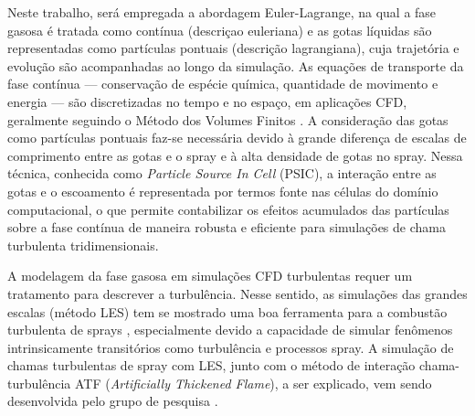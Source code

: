 

Neste trabalho, será empregada a abordagem Euler-Lagrange, na qual a fase gasosa é tratada como contínua (descriçao euleriana) e as gotas líquidas são representadas como partículas pontuais (descrição lagrangiana), cuja trajetória e evolução são acompanhadas ao longo da simulação. 
As equações de transporte da fase contínua — conservação de espécie química, quantidade de movimento e energia — são discretizadas no tempo e no espaço, em aplicações CFD, geralmente seguindo o Método dos Volumes Finitos \cite{Anderson2009}.
A consideração das gotas como partículas pontuais faz-se necessária devido à grande diferença de escalas de comprimento entre as gotas e o spray e à alta densidade de gotas no spray.
Nessa técnica, conhecida como \emph{Particle Source In Cell} (PSIC), a interação entre as gotas e o escoamento é representada por termos fonte nas células do domínio computacional, o que permite contabilizar os efeitos acumulados das partículas sobre a fase contínua de maneira robusta e eficiente para simulações de chama turbulenta tridimensionais.

A modelagem da fase gasosa em simulações CFD turbulentas requer um tratamento para descrever a turbulência. 
Nesse sentido, as simulações das grandes escalas (método LES) tem se mostrado uma boa ferramenta para a combustão turbulenta de sprays \cite{SacomanoF2020CF}, especialmente devido a capacidade de simular fenômenos intrinsicamente transitórios como turbulência e processos spray.
A simulação de chamas turbulentas de spray com LES, junto com o método de interação chama-turbulência ATF (\emph{Artificially Thickened Flame}), a ser explicado, vem sendo desenvolvida pelo grupo de pesquisa \cite{SacomanoF2017PhD,SacomanoF2019Fluids,SacomanoF2017CF,SacomanoF2020CF,SacomanoF2018CTM}.

